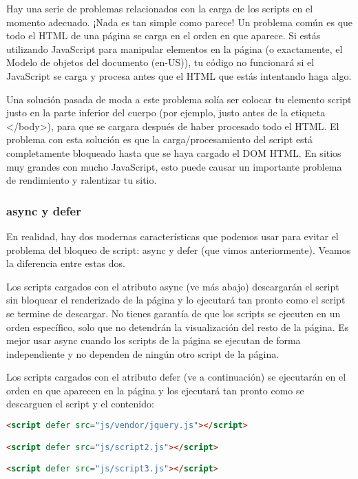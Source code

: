 \begin{enumerate}
Hay una serie de problemas relacionados con la carga de los scripts en el momento adecuado. ¡Nada es tan simple como parece! Un problema común es que todo el HTML de una página se carga en el orden en que aparece. Si estás utilizando JavaScript para manipular elementos en la página (o exactamente, el Modelo de objetos del documento (en-US)), tu código no funcionará si el JavaScript se carga y procesa antes que el HTML que estás intentando haga algo.

Una solución pasada de moda a este problema solía ser colocar tu elemento script justo en la parte inferior del cuerpo (por ejemplo, justo antes de la etiqueta </body>), para que se cargara después de haber procesado todo el HTML. El problema con esta solución es que la carga/procesamiento del script está completamente bloqueado hasta que se haya cargado el DOM HTML. En sitios muy grandes con mucho JavaScript, esto puede causar un importante problema de rendimiento y ralentizar tu sitio.

\subsubsection{async y defer}

En realidad, hay dos modernas características que podemos usar para evitar el problema del bloqueo de script: async y defer (que vimos anteriormente). Veamos la diferencia entre estas dos.

Los scripts cargados con el atributo async (ve más abajo) descargarán el script sin bloquear el renderizado de la página y lo ejecutará tan pronto como el script se termine de descargar. No tienes garantía de que los scripts se ejecuten en un orden específico, solo que no detendrán la visualización del resto de la página. Es mejor usar async cuando los scripts de la página se ejecutan de forma independiente y no dependen de ningún otro script de la página.

Los scripts cargados con el atributo defer (ve a continuación) se ejecutarán en el orden en que aparecen en la página y los ejecutará tan pronto como se descarguen el script y el contenido:

\begin{lstlisting}[language=HTML]
<script defer src="js/vendor/jquery.js"></script>

<script defer src="js/script2.js"></script>

<script defer src="js/script3.js"></script>
\end{lstlisting}


\end{enumerate}
